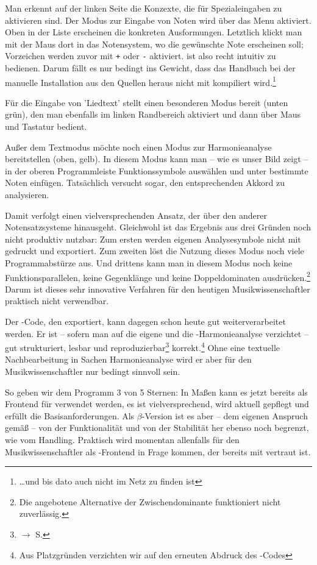 Man erkennt auf der linken Seite die Konzexte, die für Spezialeingaben zu
aktivieren sind. Der Modus zur Eingabe von Noten wird über das Menu aktiviert.
Oben in der Liste erscheinen die konkreten Ausformungen. Letztlich klickt man
mit der Maus dort in das Notensystem, wo die gewünschte Note erscheinen soll;
Vorzeichen werden zuvor mit \texttt{+} oder \texttt{-} aktiviert. 
ist also recht intuitiv zu bedienen. Darum fällt es nur bedingt ins Gewicht, dass
das Handbuch bei der manuelle Installation aus den Quellen heraus nicht mit
kompiliert wird.\footnote{\ldots und bis dato auch nicht im Netz zu finden ist}

Für die Eingabe von 'Liedtext' stellt  einen besonderen Modus
bereit (unten grün), den man ebenfalls im linken Randbereich aktiviert und dann
über Maus und Tastatur bedient.

Außer dem Textmodus möchte  noch einen Modus zur Harmonieanalyse
bereitstellen (oben, gelb). In diesem Modus kann man -- wie es unser Bild zeigt
-- in der oberen Programmleiste Funktionssymbole auswählen und unter bestimmte
Noten einfügen. Tatsächlich versucht  sogar, den entsprechenden
Akkord zu analysieren.

Damit verfolgt  einen vielversprechenden Ansatz, der über den
anderer Notensatzsysteme hinausgeht. Gleichwohl ist das Ergebnis aus drei
Gründen noch nicht produktiv nutzbar: Zum ersten werden  eigenen
Analysesymbole nicht mit gedruckt und exportiert. Zum zweiten löst die Nutzung
dieses Modus noch viele Pro\-gramm\-ab\-stürze aus. Und drittens kann man in diesem
Modus noch keine Funktionsparallelen, keine Gegenklänge und keine
Doppeldominaten ausdrücken.\footnote{Die angebotene Alternative der
Zwischendominante funktioniert nicht zuverlässig.} Darum ist dieses sehr
innovative Verfahren für den heutigen Musikwissenschaftler praktisch nicht
verwendbar.

Der -Code, den  exportiert, kann dagegen schon heute
gut weiterverarbeitet werden. Er ist -- sofern man auf die eigene und die
-Harmonieanalyse verzichtet -- gut strukturiert, lesbar und
reproduzierbar\footnote{$\rightarrow$ S.\pageref{ExportVerifikation}}
korrekt.\footnote{Aus Platzgründen verzichten wir auf den erneuten Abdruck des
-Codes} Ohne eine textuelle Nachbearbeitung in Sachen
Harmonieanalyse wird er aber für den Musikwissenschaftler nur bedingt sinnvoll
sein.

So geben wir dem Programm 3 von 5 Sternen: In Maßen kann es jetzt bereits als
Frontend für  verwendet werden, es ist vielversprechend, wird
aktuell gepflegt und erfüllt die Basisanforderungen. Als $\beta$-Version ist es
aber -- dem eigenen Anspruch gemäß -- von der Funktionalität und von der
Stabilität her ebenso noch begrenzt, wie vom Handling. Praktisch wird
 momentan allenfalls für den Musikwissenschaftler als
-Frontend in Frage kommen, der bereits mit  vertraut
ist.


%
